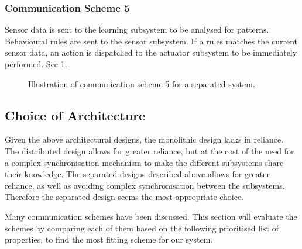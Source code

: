 \subsubsection{Communication Scheme 5}

Sensor data is sent to the learning subsystem to be analysed for patterns. Behavioural rules are sent to the sensor subsystem. If a rules matches the current sensor data, an action is dispatched to the actuator subsystem to be immediately performed. See \cref{fig:separated_subsystems_scheme5}.

\begin{figure}[htbp]
\centering
{}
\caption[Communication scheme 5]{Illustration of communication scheme 5 for a separated system.}\label{fig:separated_subsystems_scheme5}
\end{figure}

\subsection{Choice of Architecture}

Given the above architectural designs, the monolithic design lacks in reliance. The distributed design allows for greater reliance, but at the cost of the need for a complex synchronisation mechanism to make the different subsystems share their knowledge. The separated designs described above allows for greater reliance, as well as avoiding complex synchronisation between the subsystems. Therefore the separated design seems the most appropriate choice.

Many communication schemes have been discussed. This section will evaluate the schemes by comparing each of them based on the following prioritised list of properties, to find the most fitting scheme for our system.

